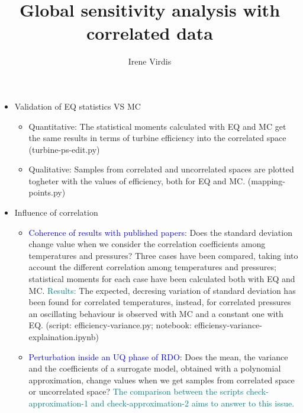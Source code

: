 \documentclass[12pt]{article}
\title{Global sensitivity analysis with correlated data}
\author{Irene Virdis}
\begin{document}
\maketitle

\begin{itemize}
%
%
%
	\item Validation of EQ statistics VS MC 
		\begin{itemize}
			\item Quantitative: The statistical moments calculated with EQ and MC get the same results in terms of turbine efficiency into the correlated space (turbine-ps-edit.py)
			\item Qualitative: Samples from correlated and uncorrelated spaces are plotted togheter with the values of efficiency, both for EQ and MC. (mapping-points.py)
		\end{itemize}
	\item{Influence of correlation}
		\begin{itemize}
			\item \textcolor{blue}{Coherence of results with published papers}: Does the standard deviation change value when we consider the correlation coefficients among temperatures and pressures? Three cases have been compared, taking into account the different correlation among temperatures and pressures; statistical moments for each case have been calculated both with EQ and MC. \textcolor{teal} {Results:} The expected, decresing variation of standard deviation has been found for correlated temperatures, instead, for correlated pressures an oscillating behaviour is observed with MC and a constant one with EQ. (script: efficiency-variance.py; notebook: efficiensy-variance-explaination.ipynb)
			\item \textcolor{blue}{Perturbation inside an UQ phase of RDO}: Does the mean, the variance and the coefficients of a surrogate model, obtained with a polynomial approximation, change values when we get samples from correlated space or uncorrelated space? \textcolor{teal} {The comparison between the scripts check-approximation-1 and check-approximation-2 aims to answer to this issue.}
		\end{itemize}





\end{itemize}
\end{document}
